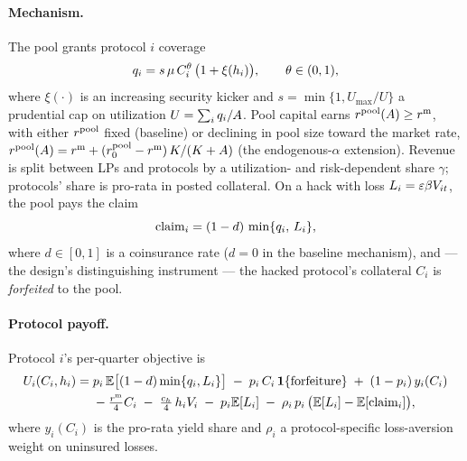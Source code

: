 \paragraph{Mechanism.} The pool grants protocol $i$ coverage
\begin{equation}\label{eq:coverage}
  q_i = s\,\mu\, C_i^{\theta}\,\bigl(1 + \xi(h_i)\bigr),
  \qquad \theta \in (0,1),
\end{equation}
where $\xi(\cdot)$ is an increasing security kicker and
$s = \min\{1, U_{\max}/U\}$ a prudential cap on utilization
$U = \sum_i q_i / A$. Pool capital earns
$r^{\mathrm{pool}}(A) \geq r^{\mathrm{m}}$, with either $r^{\mathrm{pool}}$ fixed (baseline) or
declining in pool size toward the market rate,
$r^{\mathrm{pool}}(A) = r^{\mathrm{m}} + (r^{\mathrm{pool}}_0 - r^{\mathrm{m}})\,K/(K + A)$ (the
endogenous-$\alpha$ extension). Revenue is split between LPs and
protocols by a utilization- and risk-dependent share $\gamma$;
protocols' share is pro-rata in posted collateral. On a hack with loss
$L_i = \varepsilon \beta V_{it}$, the pool pays the claim
\begin{equation}\label{eq:claim}
  \text{claim}_i = (1 - d)\,\min\{q_i,\, L_i\},
\end{equation}
where $d \in [0,1]$ is a coinsurance rate ($d = 0$ in the baseline
mechanism), and --- the design's distinguishing instrument --- the hacked
protocol's collateral $C_i$ is \emph{forfeited} to the pool.

\paragraph{Protocol payoff.} Protocol $i$'s per-quarter objective is
\begin{equation}\label{eq:protocol-utility}
\begin{aligned}
  U_i(C_i, h_i) ={}& p_i\,\mathbb{E}\bigl[(1-d)\min\{q_i, L_i\}\bigr]
     \;-\; p_i\, C_i \,\mathbf{1}\{\text{forfeiture}\}
     \;+\; (1 - p_i)\, y_i(C_i) \\
  &- \tfrac{r^{\mathrm{m}}}{4} C_i
     \;-\; \tfrac{c_h}{4}\, h_i V_i
     \;-\; p_i \mathbb{E}[L_i]
     \;-\; \rho_i\, p_i\,\bigl(\mathbb{E}[L_i] - \mathbb{E}[\text{claim}_i]\bigr),
\end{aligned}
\end{equation}
where $y_i(C_i)$ is the pro-rata yield share and $\rho_i$ a
protocol-specific loss-aversion weight on uninsured losses.

